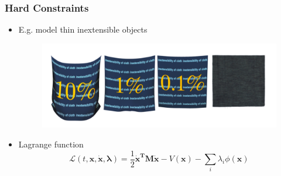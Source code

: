 \documentclass[serif,mathserif]{beamer}
\newcommand{\BOLD}[1]{\mathbf{#1}}
\begin{document}
\begin{frame}
 \frametitle{Hard Constraints}
 \begin{itemize}
  \item E.g. model thin inextensible objects 
  \begin{figure}
    \centering 
    \includegraphics[scale=0.2]{img/inextensible.png}
  \end{figure}
  \item Lagrange function
    \begin{equation*}
      \mathcal{L}(t, \BOLD{x}, \BOLD{\dot x}, \BOLD{\lambda}) = \frac{1}{2}\BOLD{\dot x^T M \dot x} - V(\BOLD{x}) - \sum_i \lambda_i \phi(\BOLD{x})
    \end{equation*}
 \end{itemize}
\end{frame}
\end{document}
